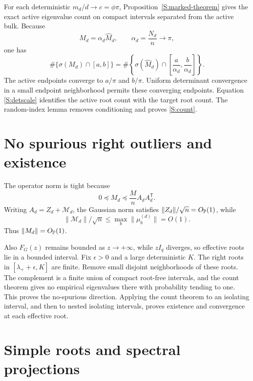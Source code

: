 \documentclass[
  aps,
  prl,
  10pt,
  onecolumn,
  longbibliography,
  nofootinbib
]{revtex4-2}
\theoremstyle{remark}
\begin{document}
For each deterministic $m_d/d\to c=\phi\pi$, Proposition~\ref{S:marked-theorem} gives the exact active eigenvalue count on compact intervals separated from the active bulk. Because
\begin{equation}
M_d=\alpha_d\widehat M_d,\qquad
\alpha_d=\frac{N_d}{n}\to\pi,
\end{equation}
one has
\begin{equation}
\#\{\sigma(M_d)\cap[a,b]\}
=
\#\!\left\{
\sigma(\widehat M_d)\cap
\left[\frac a{\alpha_d},\frac b{\alpha_d}\right]
\right\}.
\label{S:scaled-count}
\end{equation}
The active endpoints converge to $a/\pi$ and $b/\pi$. Uniform determinant convergence in a small endpoint neighborhood permits these converging endpoints. Equation \eqref{S:detscale} identifies the active root count with the target root count. The random-index lemma removes conditioning and proves \eqref{S:count}.

\section{No spurious right outliers and existence}

The operator norm is tight because
\begin{equation}
0\preceq M_d\preceq\frac{M}{n}A_dA_d^{\mathsf T}.
\end{equation}
Writing $A_d=Z_d+\mathcal M_d$, the Gaussian norm satisfies
$\|Z_d\|/\sqrt n=O_{\mathbb{P}}(1)$, while
\begin{equation}
\|\mathcal M_d\|/\sqrt n\le\max_b\|\mu_b^{(d)}\|=O(1).
\end{equation}
Thus $\|M_d\|=O_{\mathbb{P}}(1)$.

Also $F_G(z)$ remains bounded as $z\to+\infty$, while $zI_q$ diverges, so effective roots lie in a bounded interval. Fix $\epsilon>0$ and a large deterministic $K$. The right roots in $[\lambda_++\epsilon,K]$ are finite. Remove small disjoint neighborhoods of these roots. The complement is a finite union of compact root-free intervals, and the count theorem gives no empirical eigenvalues there with probability tending to one. This proves the no-spurious direction. Applying the count theorem to an isolating interval, and then to nested isolating intervals, proves existence and convergence at each effective root.

\section{Simple roots and spectral projections}
\end{document}
